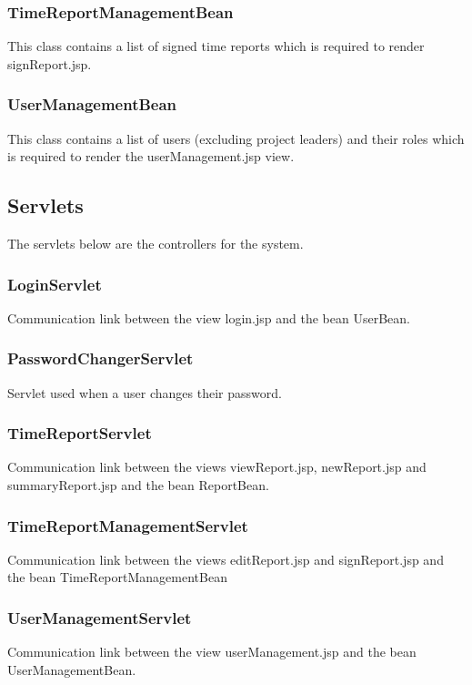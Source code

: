 \documentclass{article}
\begin{document}
\subsubsection{TimeReportManagementBean}
This class contains a list of signed time reports which is required to render signReport.jsp.

\subsubsection{UserManagementBean}
This class contains a list of users (excluding project leaders) and their roles which is required to render the userManagement.jsp view.

\subsection{Servlets}
The servlets below are the controllers for the system.

\subsubsection{LoginServlet}
Communication link between the view login.jsp and the bean UserBean.

\subsubsection{PasswordChangerServlet}
Servlet used when a user changes their password.

\subsubsection{TimeReportServlet}
Communication link between the views viewReport.jsp, newReport.jsp and summaryReport.jsp and the bean ReportBean.

\subsubsection{TimeReportManagementServlet}
Communication link between the views editReport.jsp and signReport.jsp and the bean TimeReportManagementBean

\subsubsection{UserManagementServlet}
Communication link between the view userManagement.jsp and the bean UserManagementBean.
\end{document}
